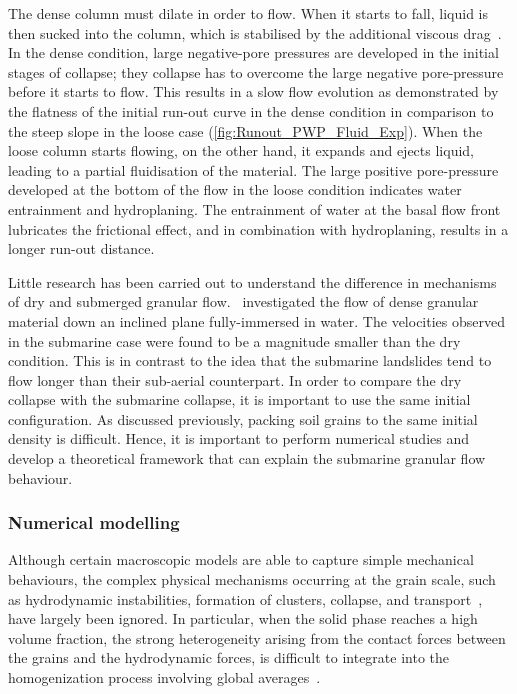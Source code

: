 The dense column must dilate in order to flow. 
When it starts to fall, liquid is then sucked into the column, which is 
stabilised by the additional viscous drag~\citep{Rondon2011,Topin2012}. In the 
dense condition, large negative-pore pressures are developed in the initial 
stages of collapse; they collapse has to overcome the large negative 
pore-pressure before it starts to flow. This results in a slow flow evolution 
as demonstrated by the flatness of the initial run-out curve in the dense 
condition in comparison to the steep slope in the loose case 
(\cref{fig:Runout_PWP_Fluid_Exp}). When the loose column starts flowing, on the 
other hand, it expands and ejects liquid, leading to a partial 
fluidisation of the material. The large positive pore-pressure 
developed at the bottom of the flow in the loose condition indicates water 
entrainment and hydroplaning. The entrainment of water at the basal flow front 
lubricates the frictional effect, and in combination with hydroplaning,  
results in a longer run-out distance.

Little research has been carried out to understand the difference in 
mechanisms of dry and submerged granular flow.~\citet{Cassar2005} investigated 
the flow of dense granular material down an 
inclined plane fully-immersed in water. The velocities observed in the 
submarine case were found to be a magnitude smaller than the dry condition. 
This is in contrast to the idea that the submarine landslides tend to flow 
longer than their sub-aerial counterpart. In order to compare the dry collapse 
with the submarine collapse, it is important to use the same initial 
configuration. As discussed previously, packing soil grains to the same initial 
density is difficult. Hence, it is important to perform numerical studies and 
develop a theoretical framework that can explain the submarine granular flow 
behaviour. 


\subsubsection{Numerical modelling}

Although certain macroscopic models are able to capture simple mechanical 
behaviours, the complex physical mechanisms occurring at the 
grain scale, such as hydrodynamic instabilities, formation of clusters, 
collapse, and transport~\citep{Peker2007,Topin2011}, have largely been ignored. 
In particular, when the solid phase reaches a high volume fraction, the strong 
heterogeneity arising from the contact forces between the grains and the 
hydrodynamic forces, is difficult to integrate into the homogenization process 
involving global averages~\citep{Topin2011}. 

